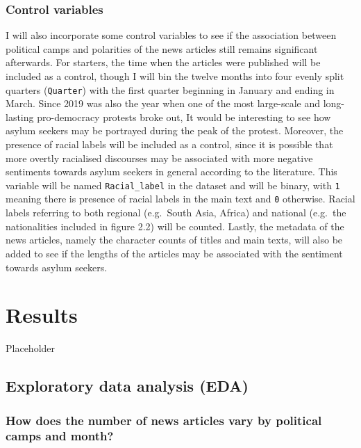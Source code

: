 \documentclass[a4paper, oneside]{report}
\begin{document}
\hypertarget{control-variables}{%
\subsection{Control variables}\label{control-variables}}

I will also incorporate some control variables to see if the association
between political camps and polarities of the news articles still
remains significant afterwards. For starters, the time when the articles
were published will be included as a control, though I will bin the
twelve months into four evenly split quarters (\texttt{Quarter}) with
the first quarter beginning in January and ending in March. Since 2019
was also the year when one of the most large-scale and long-lasting
pro-democracy protests broke out, It would be interesting to see how
asylum seekers may be portrayed during the peak of the protest.
Moreover, the presence of racial labels will be included as a control,
since it is possible that more overtly racialised discourses may be
associated with more negative sentiments towards asylum seekers in
general according to the literature. This variable will be named
\texttt{Racial\_label} in the dataset and will be binary, with
\texttt{1} meaning there is presence of racial labels in the main text
and \texttt{0} otherwise. Racial labels referring to both regional
(e.g.~South Asia, Africa) and national (e.g.~the nationalities included
in figure 2.2) will be counted. Lastly, the metadata of the news
articles, namely the character counts of titles and main texts, will
also be added to see if the lengths of the articles may be associated
with the sentiment towards asylum seekers.

\hypertarget{results}{%
\chapter{Results}\label{results}}

Placeholder

\hypertarget{exploratory-data-analysis-eda}{%
\section{Exploratory data analysis
(EDA)}\label{exploratory-data-analysis-eda}}

\hypertarget{how-does-the-number-of-news-articles-vary-by-political-camps-and-month}{%
\subsection{How does the number of news articles vary by political camps
and
month?}\label{how-does-the-number-of-news-articles-vary-by-political-camps-and-month}}
\end{document}
